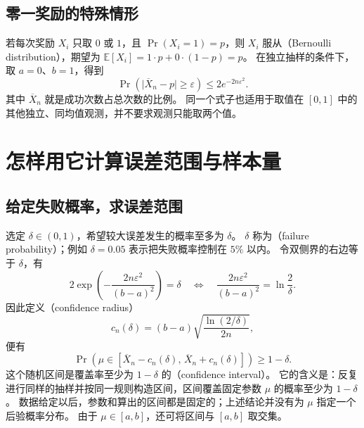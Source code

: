 \documentclass[UTF8]{ctexart}
\begin{document}
\subsection{零一奖励的特殊情形}

若每次奖励 $X_i$ 只取 $0$ 或 $1$，且 $\Pr(X_i=1)=p$，则
$X_i$ 服从（Bernoulli distribution），期望为
$\mathbb E[X_i]=1\cdot p+0\cdot(1-p)=p$。
在独立抽样的条件下，取 $a=0$、$b=1$，得到
\begin{equation}
  \Pr\!\left(\lvert\overline X_n-p\rvert\geq\varepsilon\right)
  \leq 2e^{-2n\varepsilon^2}.
  \label{eq:hoeffding-bernoulli}
\end{equation}
其中 $\overline X_n$ 就是成功次数占总次数的比例。
同一个式子也适用于取值在 $[0,1]$ 中的其他独立、同均值观测，并不要求观测只能取两个值。

\section{怎样用它计算误差范围与样本量}
\label{sec:hoeffding-applications}

\subsection{给定失败概率，求误差范围}

选定 $\delta\in(0,1)$，希望较大误差发生的概率至多为 $\delta$。
$\delta$ 称为（failure probability）；例如 $\delta=0.05$ 表示把失败概率控制在 $5\%$ 以内。
令双侧界的右边等于 $\delta$，有
\[
  2\exp\!\left(-\frac{2n\varepsilon^2}{(b-a)^2}\right)=\delta
  \quad\Longleftrightarrow\quad
  \frac{2n\varepsilon^2}{(b-a)^2}=\ln\frac{2}{\delta}.
\]
因此定义（confidence radius）
\begin{equation}
  c_n(\delta)=(b-a)\sqrt{\frac{\ln(2/\delta)}{2n}},
  \label{eq:hoeffding-confidence-radius}
\end{equation}
便有
\begin{equation}
  \Pr\!\left(\mu\in
    [\overline X_n-c_n(\delta),\,\overline X_n+c_n(\delta)]\right)
  \geq1-\delta.
  \label{eq:hoeffding-confidence-interval}
\end{equation}
这个随机区间是覆盖率至少为 $1-\delta$ 的（confidence interval）。
它的含义是：反复进行同样的抽样并按同一规则构造区间，区间覆盖固定参数 $\mu$ 的概率至少为 $1-\delta$。
数据给定以后，参数和算出的区间都是固定的；上述结论并没有为 $\mu$ 指定一个后验概率分布。
由于 $\mu\in[a,b]$，还可将区间与 $[a,b]$ 取交集。
\end{document}
